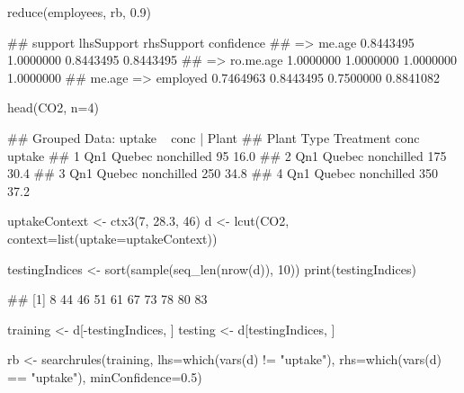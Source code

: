 \documentclass{article}\usepackage[]{graphicx}\usepackage[]{color}
\begin{document}
\begin{Schunk}
% --begin: "reduce"
\begin{Sinput}
reduce(employees, rb, 0.9)
\end{Sinput}
\begin{Soutput}
##                      support lhsSupport rhsSupport confidence
##  => me.age         0.8443495  1.0000000  0.8443495  0.8443495
##  => ro.me.age      1.0000000  1.0000000  1.0000000  1.0000000
## me.age => employed 0.7464963  0.8443495  0.7500000  0.8841082
\end{Soutput}
%
% --end: "reduce"
\end{Schunk}

\begin{Schunk}
% --begin: "pbld1"
\begin{Sinput}
head(CO2, n=4)
\end{Sinput}
\begin{Soutput}
## Grouped Data: uptake ~ conc | Plant
##   Plant   Type  Treatment conc uptake
## 1   Qn1 Quebec nonchilled   95   16.0
## 2   Qn1 Quebec nonchilled  175   30.4
## 3   Qn1 Quebec nonchilled  250   34.8
## 4   Qn1 Quebec nonchilled  350   37.2
\end{Soutput}
%
% --end: "pbld1"
\end{Schunk}

\begin{Schunk}
% --begin: "pbld2"
\begin{Sinput}
uptakeContext <- ctx3(7, 28.3, 46)
d <- lcut(CO2, context=list(uptake=uptakeContext))
\end{Sinput}
%
% --end: "pbld2"
\end{Schunk}

\begin{Schunk}
% --begin: "pbld3"
\begin{Sinput}
testingIndices <- sort(sample(seq_len(nrow(d)), 10))
print(testingIndices)
\end{Sinput}
\begin{Soutput}
##  [1]  8 44 46 51 61 67 73 78 80 83
\end{Soutput}
\begin{Sinput}
training <- d[-testingIndices, ]
testing <- d[testingIndices, ]
\end{Sinput}
%
% --end: "pbld3"
\end{Schunk}

\begin{Schunk}
% --begin: "pbld4"
\begin{Sinput}
rb <- searchrules(training,
                  lhs=which(vars(d) != "uptake"),
                  rhs=which(vars(d) == "uptake"),
                  minConfidence=0.5)
\end{Sinput}
%
% --end: "pbld4"
\end{Schunk}
\end{document}
